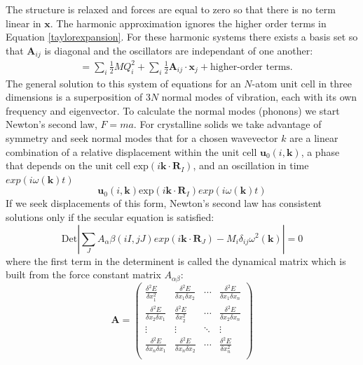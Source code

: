 The structure is relaxed and forces are equal to zero so that there is no term linear in $\textbf{x}$. The harmonic approximation ignores the higher order terms in Equation \ref{taylorexpansion}. For these harmonic systems there exists a basis set so that $\textbf{A}_{ij}$ is diagonal and the oscillators are independant of one another:
\begin{align} \label{independentoscillators}
&=\sum_i\frac{1}{2}MQ_i^2+\sum_{i}\frac{1}{2}\textbf{A}_{ij}\cdot\textbf{x}_j+\textrm{higher-order terms}.
\end{align}
The general solution to this system of equations for an $N$-atom unit cell in three dimensions is a superposition of $3N$ normal modes of vibration, each with its own frequency and eigenvector.
To calculate the normal modes (phonons) we start Newton's second law, $F=ma$. For crystalline solids we take advantage of symmetry and seek normal modes that for a chosen wavevector $k$ are a linear combination of a relative displacement within the unit cell $\textbf{u}_0(i,\textbf{k})$, a phase that depends on the unit cell $\textrm{exp}(i\textbf{k}\cdot\textbf{R}_I)$, and an oscillation in time $exp(i\omega(\textbf{k})t)$
\begin{equation} \label{normalmodes}
\textbf{u}_0(i,\textbf{k})\textrm{exp}(i\textbf{k}\cdot\textbf{R}_I)exp(i\omega(\textbf{k})t)
\end{equation}
If we seek displacements of this form, Newton's second law has consistent solutions only if the secular equation is satisfied:
\begin{equation}
\textrm{Det}|\sum_J A_{\alpha}{\beta}(iI,jJ)exp(i\textbf{k}\cdot\textbf{R}_J)-M_i\delta_{ij}\omega^2(\textbf{k})|=0
\end{equation}
where the first term in the determinent is called the dynamical matrix which is built from the force constant matrix $A_{\alpha\beta}$:
\begin{equation}
\textbf{A} = 
\begin{pmatrix} 
\frac{\delta^2E}{\delta x_1^2} &\frac{\delta^2E}{\delta x_1 \delta x_2} & \cdots & \frac{\delta^2E}{\delta x_1 \delta x_n}\\
\frac{\delta^2E}{\delta x_2 \delta x_1}&\frac{\delta^2E}{\delta x_2^2} & \cdots & \frac{\delta^2E}{\delta x_2 \delta x_n}\\
\vdots & \vdots & \ddots & \vdots \\
\frac{\delta^2E}{\delta x_n \delta x_1}&\frac{\delta^2E}{\delta x_n \delta x_2} & \cdots & \frac{\delta^2E}{\delta x_n^2}\\
\end{pmatrix}
\end{equation}

